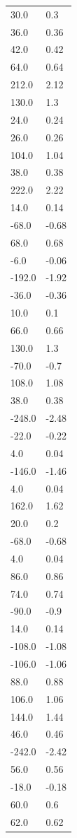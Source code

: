 \begin{longtable}{ll}
30.0 & 0.3 \\
36.0 & 0.36 \\
42.0 & 0.42 \\
64.0 & 0.64 \\
212.0 & 2.12 \\
130.0 & 1.3 \\
24.0 & 0.24 \\
26.0 & 0.26 \\
104.0 & 1.04 \\
38.0 & 0.38 \\
222.0 & 2.22 \\
14.0 & 0.14 \\
-68.0 & -0.68 \\
68.0 & 0.68 \\
-6.0 & -0.06 \\
-192.0 & -1.92 \\
-36.0 & -0.36 \\
10.0 & 0.1 \\
66.0 & 0.66 \\
130.0 & 1.3 \\
-70.0 & -0.7 \\
108.0 & 1.08 \\
38.0 & 0.38 \\
-248.0 & -2.48 \\
-22.0 & -0.22 \\
4.0 & 0.04 \\
-146.0 & -1.46 \\
4.0 & 0.04 \\
162.0 & 1.62 \\
20.0 & 0.2 \\
-68.0 & -0.68 \\
4.0 & 0.04 \\
86.0 & 0.86 \\
74.0 & 0.74 \\
-90.0 & -0.9 \\
14.0 & 0.14 \\
-108.0 & -1.08 \\
-106.0 & -1.06 \\
88.0 & 0.88 \\
106.0 & 1.06 \\
144.0 & 1.44 \\
46.0 & 0.46 \\
-242.0 & -2.42 \\
56.0 & 0.56 \\
-18.0 & -0.18 \\
60.0 & 0.6 \\
62.0 & 0.62 \\

\end{longtable}
